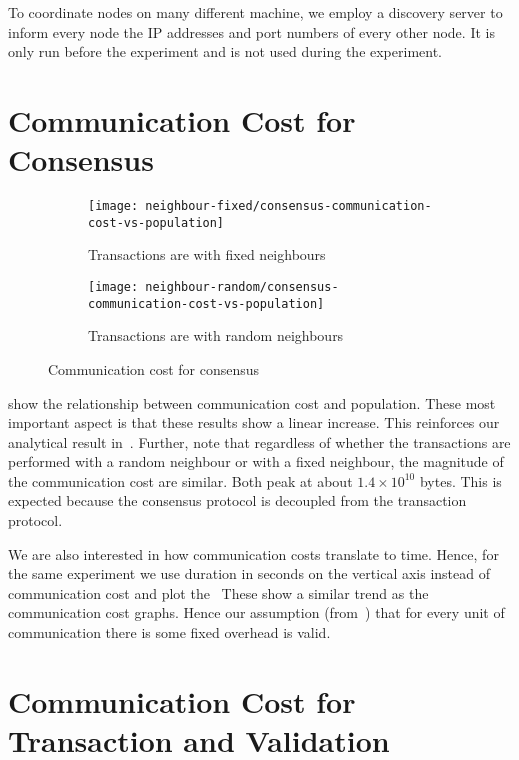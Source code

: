 To coordinate nodes on many different machine,
we employ a discovery server to inform every node the IP addresses and port numbers of every other node.
It is only run before the experiment and is not used during the experiment.


\section{Communication Cost for Consensus}

\begin{figure}[h]
  \centering
  \begin{subfigure}{\textwidth}
    \texttt{[image: neighbour-fixed/consensus-communication-cost-vs-population]}
    \caption{Transactions are with fixed neighbours}
    \label{fig:consensus-comms-fixed}
  \end{subfigure}

  \begin{subfigure}{\textwidth}
    \texttt{[image: neighbour-random/consensus-communication-cost-vs-population]}
    \caption{Transactions are with random neighbours}
    \label{fig:consensus-comms-random}
  \end{subfigure}
  \caption{Communication cost for consensus}
  \label{fig:consensus-comms}
\end{figure}

 show the relationship between communication cost and population.
These most important aspect is that these results show a linear increase.
This reinforces our analytical result in~.
Further, note that regardless of whether the transactions are performed with a random neighbour or with a fixed neighbour,
the magnitude of the communication cost are similar.
Both peak at about $1.4 \times 10^{10}$ bytes.
This is expected because the consensus protocol is decoupled from the transaction protocol.

We are also interested in how communication costs translate to time.
Hence, for the same experiment we use duration in seconds on the vertical axis instead of communication cost and plot the~
These show a similar trend as the communication cost graphs.
Hence our assumption (from~) that for every unit of communication there is some fixed overhead is valid.

\section{Communication Cost for Transaction and Validation}

